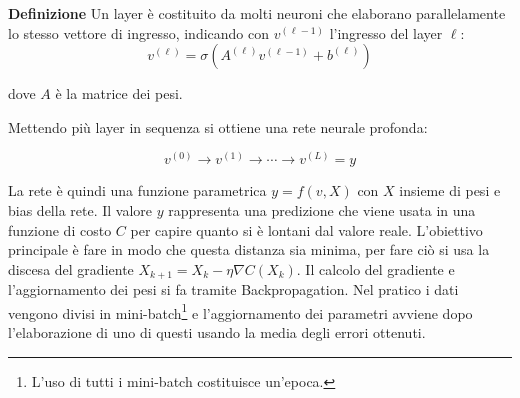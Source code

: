 \documentclass{article}
\newcommand{\df}{\noindent\textbf{Definizione} }
\begin{document}
\df Un layer è costituito da molti neuroni che elaborano parallelamente lo stesso vettore di ingresso, indicando con $v^{(\ell-1)}$ l'ingresso del layer $\ell$:
\[
v^{(\ell)}
=
\sigma(A^{(\ell)}v^{(\ell-1)}+
b^{(\ell)})
\]

dove $A$ è la matrice dei pesi.

\vspace{5pt}

\begin{figure}[ht]
    \centering
\end{figure}

\vspace{5pt}

Mettendo più layer in sequenza si ottiene una rete neurale profonda:

\[
v^{(0)}
\rightarrow
v^{(1)}
\rightarrow
\cdots
\rightarrow
v^{(L)}
=
y
\]

\vspace{5pt}

La rete è quindi una funzione parametrica $y=f(v,X)$ con $X$ insieme di pesi e bias della rete. Il valore $y$ rappresenta una predizione che viene usata in una funzione di costo $C$ per capire quanto si è lontani dal valore reale. L'obiettivo principale è fare in modo che questa distanza sia minima, per fare ciò si usa la discesa del gradiente $X_{k+1}=X_k-\eta\nabla C(X_k)$. Il calcolo del gradiente e l'aggiornamento dei pesi si fa tramite Backpropagation. Nel pratico i dati vengono divisi in mini-batch\footnote{L'uso di tutti i mini-batch costituisce un'epoca.} e l'aggiornamento dei parametri avviene dopo l'elaborazione di uno di questi usando la media degli errori ottenuti.\newline
\end{document}
